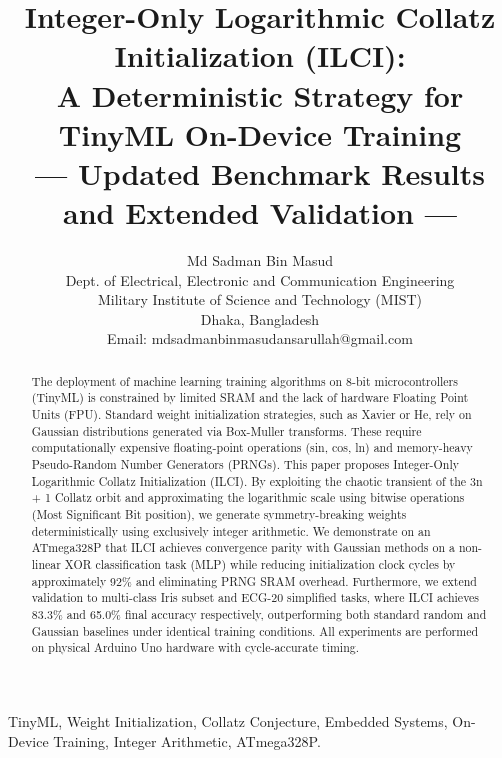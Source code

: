 \documentclass[conference]{IEEEtran}
\begin{document}
\title{Integer-Only Logarithmic Collatz Initialization (ILCI):\\
A Deterministic Strategy for TinyML On-Device Training\\
--- Updated Benchmark Results and Extended Validation ---}
\author{Md Sadman Bin Masud\\
Dept. of Electrical, Electronic and Communication Engineering\\
Military Institute of Science and Technology (MIST)\\
Dhaka, Bangladesh\\
Email: mdsadmanbinmasudansarullah@gmail.com}

\maketitle

\begin{abstract}
The deployment of machine learning training algorithms on 8-bit microcontrollers (TinyML) is constrained by limited SRAM and the lack of hardware Floating Point Units (FPU). Standard weight initialization strategies, such as Xavier or He, rely on Gaussian distributions generated via Box-Muller transforms. These require computationally expensive floating-point operations (sin, cos, ln) and memory-heavy Pseudo-Random Number Generators (PRNGs). This paper proposes Integer-Only Logarithmic Collatz Initialization (ILCI). By exploiting the chaotic transient of the 3n + 1 Collatz orbit and approximating the logarithmic scale using bitwise operations (Most Significant Bit position), we generate symmetry-breaking weights deterministically using exclusively integer arithmetic. We demonstrate on an ATmega328P that ILCI achieves convergence parity with Gaussian methods on a non-linear XOR classification task (MLP) while reducing initialization clock cycles by approximately 92\% and eliminating PRNG SRAM overhead. Furthermore, we extend validation to multi-class Iris subset and ECG-20 simplified tasks, where ILCI achieves 83.3\% and 65.0\% final accuracy respectively, outperforming both standard random and Gaussian baselines under identical training conditions. All experiments are performed on physical Arduino Uno hardware with cycle-accurate timing.
\end{abstract}

\begin{IEEEkeywords}
TinyML, Weight Initialization, Collatz Conjecture, Embedded Systems, On-Device Training, Integer Arithmetic, ATmega328P.
\end{IEEEkeywords}
\end{document}
